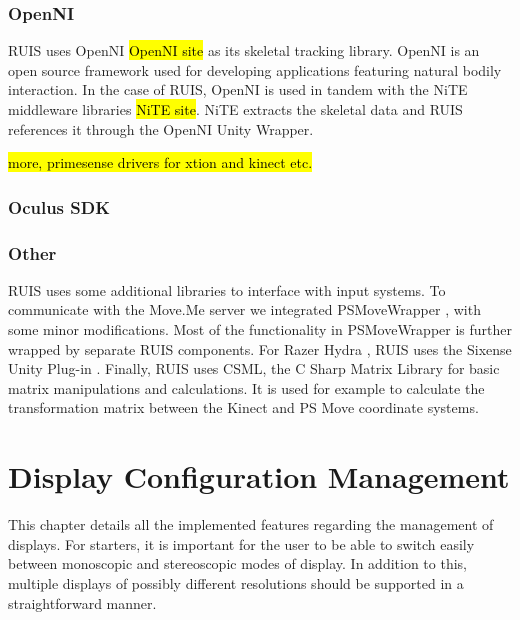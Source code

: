 \documentclass[12pt,a4paper,oneside,pdftex]{report}
\begin{document}
\subsection{OpenNI}
\label{subsection:external:openni}

RUIS uses OpenNI \hl{OpenNI site} as its skeletal tracking library. OpenNI is an open source framework used for developing applications featuring natural bodily interaction. In the case of RUIS, OpenNI is used in tandem with the NiTE middleware libraries \hl{NiTE site}. NiTE extracts the skeletal data and RUIS references it through the OpenNI Unity Wrapper. 

\hl{more, primesense drivers for xtion and kinect etc.}

\subsection{Oculus SDK}
\label{subsection:external:oculussdk}

\subsection{Other}
\label{subsection:external:other}

RUIS uses some additional libraries to interface with input systems. To communicate with the Move.Me server we integrated PSMoveWrapper \cite{PSMoveWrapper}, with some minor modifications. Most of the functionality in PSMoveWrapper is further wrapped by separate RUIS components. For Razer Hydra \cite{RazerHydra}, RUIS uses the Sixense Unity Plug-in \cite{RazerUnityPlugin}. Finally, RUIS uses CSML, the C Sharp Matrix Library for basic matrix manipulations and calculations. It is used for example to calculate the transformation matrix between the Kinect and PS Move coordinate systems.




\chapter{Display Configuration Management}
\label{chapter:displayconfigurationmanagement}

This chapter details all the implemented features regarding the management of displays. For starters, it is important for the user to be able to switch easily between monoscopic and stereoscopic modes of display. In addition to this, multiple displays of possibly different resolutions should be supported in a straightforward manner.
\end{document}
